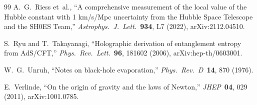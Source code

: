 \documentclass[12pt,letterpaper]{article}
\theoremstyle{plain}
\theoremstyle{definition}
\begin{document}
\begin{thebibliography}{99}
A.~G.\ Riess et~al.,
``A comprehensive measurement of the local value of the Hubble constant with 1 km/s/Mpc uncertainty from the Hubble Space Telescope and the SH0ES Team,''
\textit{Astrophys.\ J.\ Lett.}\ \textbf{934}, L7 (2022), arXiv:2112.04510.

S.\ Ryu and T.\ Takayanagi,
``Holographic derivation of entanglement entropy from AdS/CFT,''
\textit{Phys.\ Rev.\ Lett.}\ \textbf{96}, 181602 (2006), arXiv:hep-th/0603001.

W.~G.\ Unruh,
``Notes on black-hole evaporation,''
\textit{Phys.\ Rev.\ D}\ \textbf{14}, 870 (1976).

E.\ Verlinde,
``On the origin of gravity and the laws of Newton,''
\textit{JHEP}\ \textbf{04}, 029 (2011), arXiv:1001.0785.

\end{thebibliography}
\end{document}
